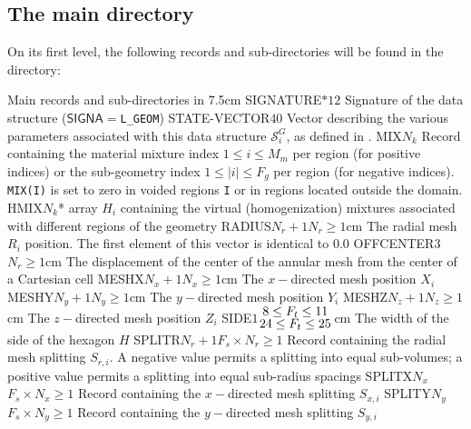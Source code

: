 \subsection{The main  directory}\label{sect:geometrydirmain}

On its first level, the
following records and sub-directories will be found in the  directory:

\begin{DescriptionEnregistrement}{Main records and sub-directories in }{7.5cm}
\CharEnr
  {SIGNATURE}{$*12$}
  {Signature of the data structure ($\mathsf{SIGNA}=${\tt L\_GEOM})}
\IntEnr
  {STATE-VECTOR}{$40$}
  {Vector describing the various parameters associated with this data structure $\mathcal{S}^{G}_{i}$,
  as defined in .}
\IntEnr
  {MIX}{$N_{k}$}
  {Record containing the material mixture index $1\le i \le M_m$ per region (for positive indices) or
  the sub-geometry index $1\le |i| \le F_g$ per region (for negative indices). {\tt MIX(I)} is set to
  zero in voided regions {\tt I} or in regions located outside the domain.}
\OptIntEnr
  {HMIX}{$N_{k}$}{*}
  {array $H_{i}$ containing the virtual (homogenization) mixtures associated with different regions of the geometry}
\OptRealEnr
  {RADIUS}{$N_{r}+1$}{$N_{r}\ge 1$}{cm}
  {The radial mesh $R_{i}$ position. The first element of this vector is identical to 0.0}
\OptRealEnr
  {OFFCENTER}{$3$}{$N_{r}\ge 1$}{cm}
  {The displacement of the center of the annular mesh from the center of a Cartesian cell}
\OptRealEnr
  {MESHX}{$N_{x}+1$}{$N_{x}\ge 1$}{cm}
  {The $x-$directed mesh position $X_{i}$}
\OptRealEnr
  {MESHY}{$N_{y}+1$}{$N_{y}\ge 1$}{cm}
  {The $y-$directed mesh position $Y_{i}$}
\OptRealEnr
  {MESHZ}{$N_{z}+1$}{$N_{z}\ge 1$}{cm}
  {The $z-$directed mesh position $Z_{i}$}
\OptRealEnr
  {SIDE}{$1$}{${{\displaystyle 8\le F_{t}\le 11} \atop \displaystyle {24\le F_{t}\le 25}}$}{cm}
  {The width of the side of the hexagon $H$}
\OptIntEnr
  {SPLITR}{$N_{r}+1$}{$F_{s}\times N_{r}\ge 1$}
  {Record containing the radial mesh splitting $S_{r,i}$. A negative value permits a splitting into
  equal sub-volumes; a positive value permits a splitting into equal sub-radius spacings}
\OptIntEnr
  {SPLITX}{$N_{x}$}{$F_{s}\times N_{x}\ge 1$}
  {Record containing the $x-$directed mesh splitting $S_{x,i}$}
\OptIntEnr
  {SPLITY}{$N_{y}$}{$F_{s}\times N_{y}\ge 1$}
  {Record containing the $y-$directed mesh splitting $S_{y,i}$}

\end{DescriptionEnregistrement}

